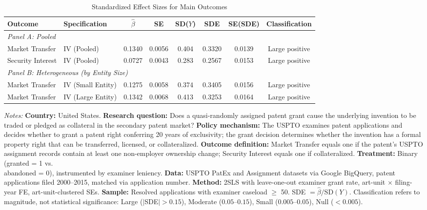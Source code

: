 \begin{table}[H]
\centering
\caption{Standardized Effect Sizes for Main Outcomes}
\label{tab:sde}
\begin{threeparttable}
\begin{adjustbox}{max width=\textwidth}
\begin{tabular}{llcccccc}
\toprule
Outcome & Specification & $\hat{\beta}$ & SE & SD($Y$) & SDE & SE(SDE) & Classification \\
\midrule
\multicolumn{8}{l}{\textit{Panel A: Pooled}} \\
Market Transfer & IV (Pooled) & 0.1340 & 0.0056 & 0.404 & 0.3320 & 0.0139 & Large positive \\
Security Interest & IV (Pooled) & 0.0727 & 0.0043 & 0.283 & 0.2567 & 0.0153 & Large positive \\
\midrule
\multicolumn{8}{l}{\textit{Panel B: Heterogeneous (by Entity Size)}} \\
Market Transfer & IV (Small Entity) & 0.1275 & 0.0058 & 0.374 & 0.3405 & 0.0156 & Large positive \\
Market Transfer & IV (Large Entity) & 0.1342 & 0.0068 & 0.413 & 0.3253 & 0.0164 & Large positive \\
\bottomrule
\end{tabular}
\end{adjustbox}
\end{threeparttable}
\par\vspace{0.5em}
\begin{minipage}{\textwidth}
\footnotesize
\textit{Notes:} \textbf{Country:} United States. \textbf{Research question:} Does a quasi-randomly assigned patent grant cause the underlying invention to be traded or pledged as collateral in the secondary patent market? \textbf{Policy mechanism:} The USPTO examines patent applications and decides whether to grant a patent right conferring 20 years of exclusivity; the grant decision determines whether the invention has a formal property right that can be transferred, licensed, or collateralized. \textbf{Outcome definition:} Market Transfer equals one if the patent's USPTO assignment records contain at least one non-employer ownership change; Security Interest equals one if collateralized. \textbf{Treatment:} Binary (granted = 1 vs.\\ abandoned = 0), instrumented by examiner leniency. \textbf{Data:} USPTO PatEx and Assignment datasets via Google BigQuery, patent applications filed 2000--2015, matched via application number. \textbf{Method:} 2SLS with leave-one-out examiner grant rate, art-unit $\times$ filing-year FE, art-unit-clustered SEs. \textbf{Sample:} Resolved applications with examiner caseload $\geq$ 50. SDE $= \hat{\beta} / \text{SD}(Y)$. Classification refers to magnitude, not statistical significance: Large ($|$SDE$| > 0.15$), Moderate ($0.05$--$0.15$), Small ($0.005$--$0.05$), Null ($< 0.005$).
\end{minipage}
\end{table}
